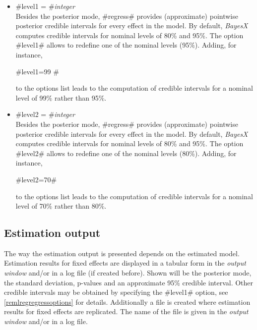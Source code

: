   
\begin{itemize}
\item \label{remlreglevel1} #level1 = #{\em integer} \\
Besides the posterior mode, #regress# provides (approximate)
pointwise posterior credible intervals for every effect in the
model. By default, {\em BayesX} computes credible intervals for
nominal levels of 80\% and 95\%. The option #level1# allows to
redefine one of the nominal levels (95\%). Adding, for instance,

#level1=99 #

to the options list leads to the computation of credible intervals
for a nominal level of 99\% rather than 95\%.
\item \label{remlreglevel2} #level2 = #{\em integer} \\
Besides the posterior mode, #regress# provides (approximate)
pointwise posterior credible intervals for every effect in the
model. By default, {\em BayesX} computes credible intervals for
nominal levels of 80\% and 95\%. The option #level2# allows to
redefine one of the nominal levels (80\%). Adding, for instance,

#level2=70#

to the options list leads to the computation of credible intervals
for a nominal level of 70\% rather than 80\%.
\end{itemize}

\subsection{Estimation output}

The way the estimation output is presented depends on the estimated
model. Estimation results for fixed effects are displayed in a
tabular form in the {\em output window} and/or in a log file (if
created before). Shown will be the posterior mode, the standard
deviation, p-values and an approximate 95\% credible interval. Other
credible intervals may be obtained by specifying the #level1#
option, see \autoref{remlregregressoptions} for details.
Additionally a file is created where estimation results for fixed
effects are replicated. The name of the file is given in the {\em
output window} and/or in a log file.

